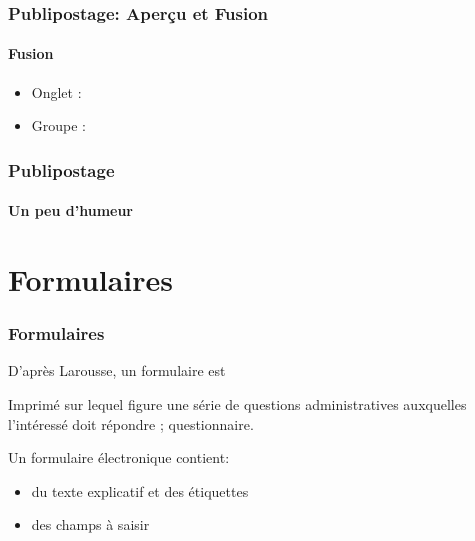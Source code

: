 \documentclass[xcolor=table]{beamer}
\begin{document}
\begin{frame}
\frametitle{Publipostage: Aperçu et Fusion}
\framesubtitle{Fusion}

\begin{minipage}{0.69\textwidth}
	\begin{itemize}
		\item Onglet : 
		\item Groupe : 
	\end{itemize}
\end{minipage}
\begin{minipage}{0.30\textwidth}
	
\end{minipage}

\end{frame}

\begin{frame}
\frametitle{Publipostage}
\framesubtitle{Un peu d'humeur}
\begin{center}
\end{center}
\end{frame}


\section{Formulaires}

\begin{frame}
\frametitle{Formulaires}

\begin{minipage}{0.50\textwidth}
	D'après Larousse, un formulaire est 
	{
	\setlength{\textwidth}{.9\textwidth}%
	\begin{definition}
		Imprimé sur lequel figure une série de questions administratives auxquelles l'intéressé doit répondre ; questionnaire.
	\end{definition}
    }

	Un formulaire électronique contient:
	\begin{itemize}
		\item du texte explicatif et des étiquettes
		\item des champs à saisir 
	\end{itemize}
\end{minipage}
\begin{minipage}{0.49\textwidth}
\end{minipage}

\end{frame}
\end{document}
